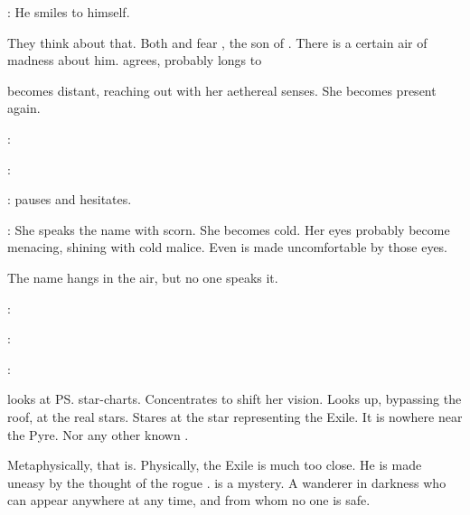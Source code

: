 \Takestsha: 
He smiles to himself.

They think about that.
Both \Takestsha and \Psyrex fear \Vizsherioch, the son of \Secherdamon.
There is a certain air of madness about him. 
\Psyrex agrees, \Vizsherioch probably longs to 

\Takestsha becomes distant, reaching out with her aethereal senses.
She becomes present again.

\Psyrex:

\Takestsha:

\Psyrex:
\Psyrex pauses and hesitates. 

\Takestsha: 
She speaks the name with scorn. 
She becomes cold. 
Her eyes probably become menacing, shining with cold \ophidian malice.
Even \Psyrex is made uncomfortable by those eyes.

The name \quo{\QuessanthIshnaruchaefir} hangs in the air, but no one speaks it. 

\Psyrex:

\Vizsherioch:

\Psyrex:
  
\Takestsha looks at \ps{\Psyrex} star-charts. 
Concentrates to shift her vision. 
Looks up, bypassing the roof, at the real stars. 
Stares at the star representing the Exile. 
It is nowhere near the Pyre. 
Nor any other known \matrix. 

Metaphysically, that is.
Physically, the Exile is much too close. 
He is made uneasy by the thought of the rogue \vertex. 
\Ishnaruchaefir is a mystery. 
A wanderer in darkness who can appear anywhere at any time, and from whom no one is safe. 

